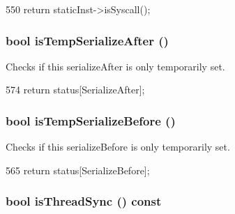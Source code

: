 \begin{DoxyCode}
550 { return staticInst->isSyscall(); }
\end{DoxyCode}
\hypertarget{classBaseDynInst_a8d1ad9904dbbde344554070bfaaab86f}{
\subsubsection[{isTempSerializeAfter}]{\setlength{\rightskip}{0pt plus 5cm}bool isTempSerializeAfter ()}}
\label{classBaseDynInst_a8d1ad9904dbbde344554070bfaaab86f}
Checks if this serializeAfter is only temporarily set. 


\begin{DoxyCode}
574 { return status[SerializeAfter]; }
\end{DoxyCode}
\hypertarget{classBaseDynInst_a4df2bcaf5414d6db99fb8a5b0aba708a}{
\subsubsection[{isTempSerializeBefore}]{\setlength{\rightskip}{0pt plus 5cm}bool isTempSerializeBefore ()}}
\label{classBaseDynInst_a4df2bcaf5414d6db99fb8a5b0aba708a}
Checks if this serializeBefore is only temporarily set. 


\begin{DoxyCode}
565 { return status[SerializeBefore]; }
\end{DoxyCode}
\hypertarget{classBaseDynInst_ae1376a5b7bbe66f8bcf8b3517802c85f}{
\subsubsection[{isThreadSync}]{\setlength{\rightskip}{0pt plus 5cm}bool isThreadSync () const}}
\label{classBaseDynInst_ae1376a5b7bbe66f8bcf8b3517802c85f}



